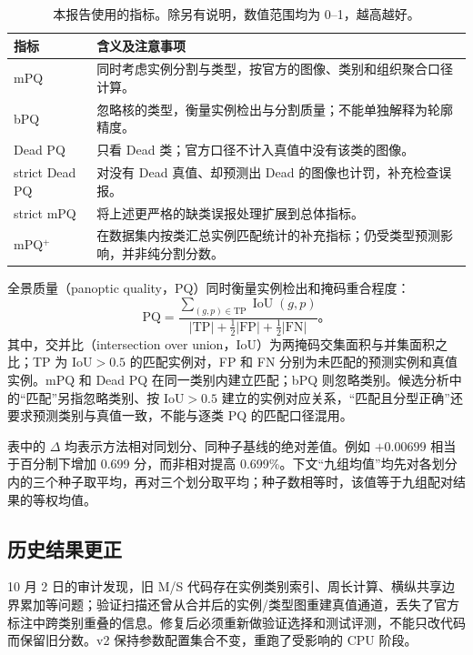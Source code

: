 \documentclass[11pt,a4paper,UTF8,fontset=fandol]{ctexart}
\begin{document}
\begin{table}[H]
\centering\small
\caption{本报告使用的指标。除另有说明，数值范围均为 0--1，越高越好。}
\begin{tabularx}{\linewidth}{lY}\toprule
指标 & 含义及注意事项\\\midrule
mPQ & 同时考虑实例分割与类型，按官方的图像、类别和组织聚合口径计算。\\
bPQ & 忽略核的类型，衡量实例检出与分割质量；不能单独解释为轮廓精度。\\
Dead PQ & 只看 Dead 类；官方口径不计入真值中没有该类的图像。\\
strict Dead PQ & 对没有 Dead 真值、却预测出 Dead 的图像也计罚，补充检查误报。\\
strict mPQ & 将上述更严格的缺类误报处理扩展到总体指标。\\
mPQ$^+$ & 在数据集内按类汇总实例匹配统计的补充指标；仍受类型预测影响，并非纯分割分数。\\\bottomrule
\end{tabularx}
\end{table}

全景质量（panoptic quality，PQ）同时衡量实例检出和掩码重合程度\cite{pq}：
\begin{equation}
\mathrm{PQ}=\frac{\sum_{(g,p)\in\mathrm{TP}}\operatorname{IoU}(g,p)}{|\mathrm{TP}|+\tfrac12|\mathrm{FP}|+\tfrac12|\mathrm{FN}|}\text{。}
\end{equation}
其中，交并比（intersection over union，IoU）为两掩码交集面积与并集面积之比；TP 为 IoU$>0.5$ 的匹配实例对，FP 和 FN 分别为未匹配的预测实例和真值实例。mPQ 和 Dead PQ 在同一类别内建立匹配；bPQ 则忽略类别。候选分析中的“匹配”另指忽略类别、按 IoU$>0.5$ 建立的实例对应关系，“匹配且分型正确”还要求预测类别与真值一致，不能与逐类 PQ 的匹配口径混用。

表中的 $\Delta$ 均表示方法相对同划分、同种子基线的绝对差值。例如 $+0.00699$ 相当于百分制下增加 0.699 分，而非相对提高 0.699\%。下文“九组均值”均先对各划分内的三个种子取平均，再对三个划分取平均；种子数相等时，该值等于九组配对结果的等权均值。

\subsection{历史结果更正}

10 月 2 日的审计发现，旧 M/S 代码存在实例类别索引、周长计算、横纵共享边界累加等问题；验证扫描还曾从合并后的实例/类型图重建真值通道，丢失了官方标注中跨类别重叠的信息。修复后必须重新做验证选择和测试评测，不能只改代码而保留旧分数。v2 保持参数配置集合不变，重跑了受影响的 CPU 阶段。
\end{document}
